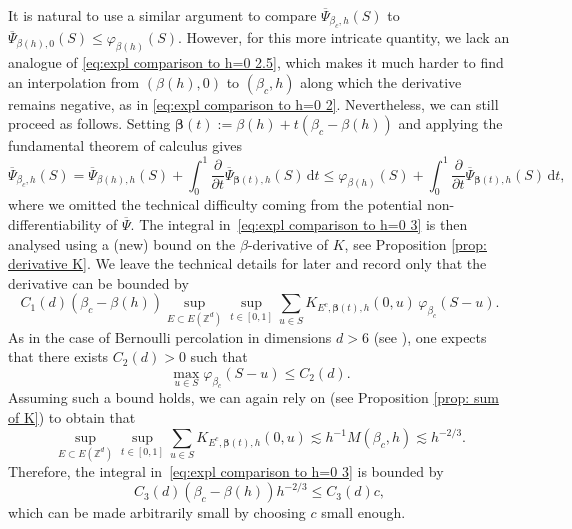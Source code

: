 \documentclass[10pt,a4paper]{amsart}
\numberwithin{equation}{section}
\begin{document}
It is natural to use a similar argument to compare $\overline{\Psi}_{\beta_c,h}(S)$ to 
$\overline{\Psi}_{\beta(h),0}(S)\leq\varphi_{\beta(h)}(S)$. However, for this more intricate quantity, we lack an analogue of \eqref{eq:expl comparison to h=0 2.5}, which makes it much harder to find an interpolation from $(\beta(h),0)$ to $(\beta_c,h)$ along which the derivative remains negative, as in \eqref{eq:expl comparison to h=0 2}. Nevertheless, we can still proceed as follows. Setting 
$\boldsymbol{\beta}(t):=\beta(h)+t(\beta_c-\beta(h))$ and applying the 
fundamental theorem of calculus gives
\begin{equation}\label{eq:expl comparison to h=0 3}
    \overline{\Psi}_{\beta_c,h}(S)
    =\overline{\Psi}_{\beta(h),h}(S)
    +\int_0^1\frac{\partial}{\partial t}
    \overline{\Psi}_{\boldsymbol{\beta}(t),h}(S)\,\mathrm{d}t
    \leq\varphi_{\beta(h)}(S)
    +\int_0^1\frac{\partial}{\partial t}
    \overline{\Psi}_{\boldsymbol{\beta}(t),h}(S)\,\mathrm{d}t,
\end{equation}
where we omitted the technical difficulty coming from the potential non-differentiability of $\overline{\Psi}$. The 
integral in~\eqref{eq:expl comparison to h=0 3} is then analysed using a (new) bound on the $\beta$-derivative of $K$, see Proposition \ref{prop: derivative K}. We leave the technical details for later and record only that the derivative can be bounded by
\begin{equation}
    C_1(d)(\beta_c-\beta(h))\sup_{E\subset E(\mathbb{Z}^d)}
    \sup_{t\in[0,1]}\sum_{u\in S}
    K_{E^c,\boldsymbol{\beta}(t),h}(0,u)\,\varphi_{\beta_c}(S-u).
\end{equation}
As in the case of Bernoulli percolation in dimensions $d>6$ (see 
\cite{panis2026reversing}), one expects that there exists $C_2(d)>0$ such that
\begin{equation}\label{eq:expl comparison to h=0 4}
	\max_{u\in S}\varphi_{\beta_c}(S-u)\leq C_2(d).
\end{equation}
Assuming such a bound holds, we can again rely on \cite{AizenmanFernandezCriticalBehaviorMagnetization1986} (see Proposition \ref{prop: sum of K}) to obtain that
\begin{equation}
	\sup_{E\subset E(\mathbb{Z}^d)}
    \sup_{t\in[0,1]}\sum_{u\in S}
    K_{E^c,\boldsymbol{\beta}(t),h}(0,u)\lesssim h^{-1}M(\beta_c,h)\lesssim h^{-2/3}.
\end{equation}
Therefore, the integral 
in~\eqref{eq:expl comparison to h=0 3} is bounded by
\begin{equation}
    C_3(d)(\beta_c-\beta(h))h^{-2/3}\leq C_3(d) c,
\end{equation}
which can be made arbitrarily small by choosing $c$ small 
enough.
\end{document}
